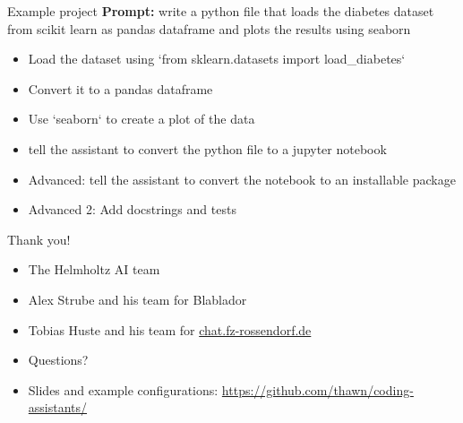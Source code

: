 \documentclass[
  aspectratio=1610,
]{beamer}
\begin{document}
\begin{frame}{Example project}
  \textbf{Prompt:} write a python file that loads the diabetes dataset from scikit learn as pandas dataframe and plots the results using seaborn
  \begin{itemize}
    \item Load the dataset using `from sklearn.datasets import load\_diabetes`
    \item Convert it to a pandas dataframe
    \item Use `seaborn` to create a plot of the data
    \item tell the assistant to convert the python file to a jupyter notebook
    \item Advanced: tell the assistant to convert the notebook to an installable package
    \item Advanced 2: Add docstrings and tests
  \end{itemize}
\end{frame}


\begin{frame}{Thank you!}
  \begin{itemize}
    \item The Helmholtz AI team
    \item Alex Strube and his team for Blablador
    \item Tobias Huste and his team for \href{https://chat.fz-rossendorf.de}{chat.fz-rossendorf.de}
    \item Questions?
    \item Slides and example configurations: \href{https://github.com/thawn/coding-assistants/}{https://github.com/thawn/coding-assistants/}
  \end{itemize}

\end{frame}
\end{document}
